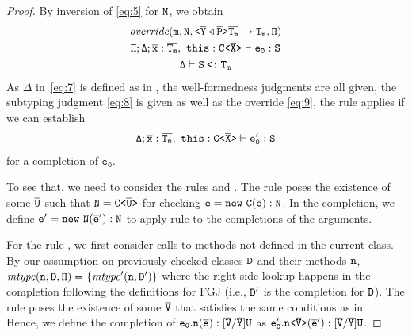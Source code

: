 \begin{proof}
    By inversion of \eqref{eq:5} for ${\tt M}$, we obtain
    \begin{gather}
      \label{eq:6}
      \mathtt{\textit{override}(m, N, \mathtt{ \texttt{<} \overline{\tt Y} \triangleleft \overline{\tt P} \texttt{>} }\overline{\tt T_m} \to T_m,
        \Pi) } \\
      \label{eq:9}
      \mathtt{\Pi; \Delta ; \overline{\tt x}:\overline{\tt T_m},\ this : \mathtt{C \texttt{<} \overline{\tt X} \texttt{>} } \vdash e_0 : S} \\
      \label{eq:8}
      \mathtt{\Delta \vdash S \mathbin{\texttt{<:}}  T_m }
    \end{gather}
    As $\mathtt{\Delta}$ in~\eqref{eq:7} is defined as in , the well-formedness
    judgments are all given, the subtyping judgment \eqref{eq:8} is given as well as the override
    \eqref{eq:9}, the rule  applies if we can establish
    \begin{gather}
      \label{eq:10}
      \mathtt{\Delta ; \overline{\tt x}:\overline{\tt T_m},\ this : \mathtt{C \texttt{<} \overline{\tt X} \texttt{>} } \vdash e_0' : S}
    \end{gather}
    for a completion of $\mathtt{e_0}$.

    To see that, we need to consider the rules  and . The
     rule poses the existence of some $\overline{\tt U}$ such that ${\tt N} =
    \mathtt{C \texttt{<} \overline{\tt U} \texttt{>} }$ for checking ${\tt e} = {\tt new}\ {\tt C} (\overline{\tt e}) : {\tt N}$. In the completion, we
    define ${\tt e'} = {\tt new}\ {\tt N} (\overline{\tt e}') : {\tt N}$ to apply rule  to the completions
    of the arguments.

    For the rule , we first consider calls to methods not defined in the current
    class. By our assumption on previously checked classes ${\tt D}$ and their methods ${\tt n}$,
    $\mathit{mtype} ({\tt n}, {\tt D}, {\tt \Pi}) = \{\mathit{mtype}' ({\tt n}, {\tt D}')\}$ where the right
    side lookup happens in the completion following the definitions for FGJ (i.e., ${\tt D'}$ is the
    completion for ${\tt D}$). The  rule poses the existence of some $\overline{\tt V}$ that
    satisfies the same conditions as in . Hence, we define the completion of
    $\mathtt{e_0.{\tt n}(\overline{\tt e}) : [\overline{\tt V}/\overline{\tt Y}]U }$ as
    $\mathtt{e_0'.\mathtt{n \texttt{<} \overline{\tt V} \texttt{>} }(\overline{\tt e}') : [\overline{\tt V}/\overline{\tt Y}]U }$.


\end{proof}
